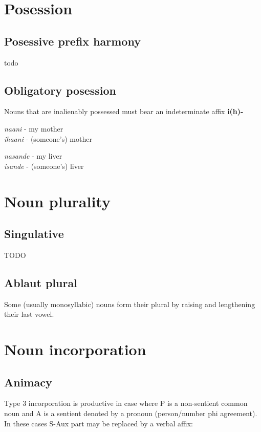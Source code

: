 \documentclass[11pt]{article}
\begin{document}
\section{Posession}

\subsection{Posessive prefix harmony}

todo

\subsection{Obligatory posession}

Nouns that are inalienably possessed must bear an indeterminate affix \textbf{i(h)-}

\begin{exe}
\ex \textit{naani} - my mother \\
 \textit{ihaani} - (someone's) mother

\ex \textit{nasande} - my liver \\
 \textit{isande} - (someone's) liver

\end{exe}


\section{Noun plurality}
\subsection{Singulative}
TODO

\subsection{Ablaut plural}
Some (usually monosyllabic) nouns form their plural by raising and lengthening their last vowel.



\section{Noun incorporation}

\subsection{Animacy}
Type 3 incorporation is productive in case where P is a non-sentient common noun and A is a sentient denoted by a pronoun (person/number phi agreement). In these cases S-Aux part may be replaced by a verbal affix:
\end{document}
